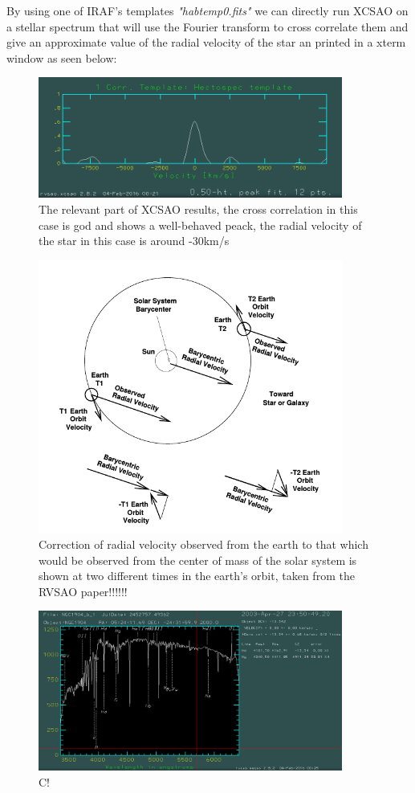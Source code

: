 By using one of IRAF's templates \textit{"habtemp0.fits"} we can directly run XCSAO on a stellar spectrum that will use the Fourier transform to cross correlate them and give an approximate value of the radial velocity of the star an printed in a xterm window as seen below: 

\begin{figure}[H]
\centering
\includegraphics[width=10cm]{images/xcsao.png}
\caption[XCSAO results]{The relevant part of XCSAO results, the cross correlation in this case is god and shows a well-behaved peack, the radial velocity of the star in this case is around -30km/s}
\end{figure}

\begin{figure}[H]
\centering
\includegraphics[width=10cm]{images/bcvcor.png}
\caption[The nature of the barycenter shift of radial velocities]{Correction of radial velocity observed from the earth to that which would be observed from the center of mass of the solar system is shown at two different times in the earth's orbit, taken from the RVSAO paper!!!!!!}
\end{figure}


\begin{figure}[H]
\centering
\includegraphics[width=10cm]{images/emsao.png}
\caption[Ts]{C!}
\end{figure}




